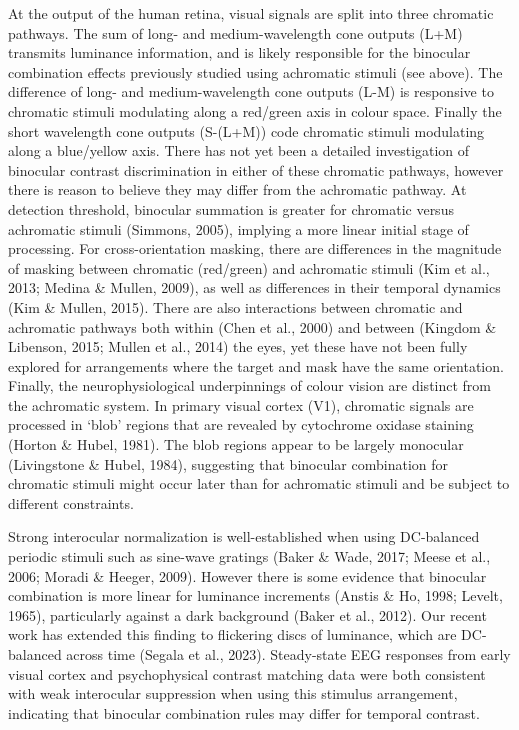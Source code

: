 \documentclass[
]{article}
\begin{document}
At the output of the human retina, visual signals are split into three chromatic pathways. The sum of long- and medium-wavelength cone outputs (L+M) transmits luminance information, and is likely responsible for the binocular combination effects previously studied using achromatic stimuli (see above). The difference of long- and medium-wavelength cone outputs (L-M) is responsive to chromatic stimuli modulating along a red/green axis in colour space. Finally the short wavelength cone outputs (S-(L+M)) code chromatic stimuli modulating along a blue/yellow axis. There has not yet been a detailed investigation of binocular contrast discrimination in either of these chromatic pathways, however there is reason to believe they may differ from the achromatic pathway. At detection threshold, binocular summation is greater for chromatic versus achromatic stimuli (Simmons, 2005), implying a more linear initial stage of processing. For cross-orientation masking, there are differences in the magnitude of masking between chromatic (red/green) and achromatic stimuli (Kim et al., 2013; Medina \& Mullen, 2009), as well as differences in their temporal dynamics (Kim \& Mullen, 2015). There are also interactions between chromatic and achromatic pathways both within (Chen et al., 2000) and between (Kingdom \& Libenson, 2015; Mullen et al., 2014) the eyes, yet these have not been fully explored for arrangements where the target and mask have the same orientation. Finally, the neurophysiological underpinnings of colour vision are distinct from the achromatic system. In primary visual cortex (V1), chromatic signals are processed in `blob' regions that are revealed by cytochrome oxidase staining (Horton \& Hubel, 1981). The blob regions appear to be largely monocular (Livingstone \& Hubel, 1984), suggesting that binocular combination for chromatic stimuli might occur later than for achromatic stimuli and be subject to different constraints.

Strong interocular normalization is well-established when using DC-balanced periodic stimuli such as sine-wave gratings (Baker \& Wade, 2017; Meese et al., 2006; Moradi \& Heeger, 2009). However there is some evidence that binocular combination is more linear for luminance increments (Anstis \& Ho, 1998; Levelt, 1965), particularly against a dark background (Baker et al., 2012). Our recent work has extended this finding to flickering discs of luminance, which are DC-balanced across time (Segala et al., 2023). Steady-state EEG responses from early visual cortex and psychophysical contrast matching data were both consistent with weak interocular suppression when using this stimulus arrangement, indicating that binocular combination rules may differ for temporal contrast.
\end{document}
